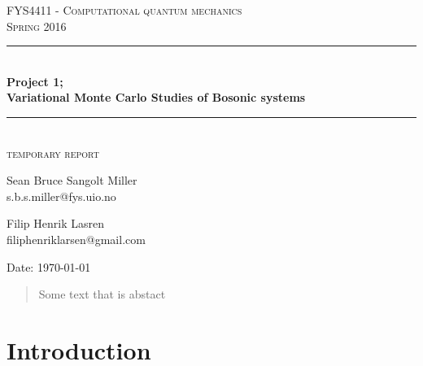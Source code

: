\documentclass[english, a4paper]{article}
\begin{document}
\renewcommand{\figurename}{Figure}
\begin{titlepage}
\begin{center}

\textsc{\Large FYS4411 - Computational quantum mechanics }\\[0.5cm]
\textsc{\Large Spring 2016}\\[1.5cm]
\rule{\linewidth}{0.5mm} \\[0.4cm]
{ \huge \bfseries  Project 1;\\ Variational Monte Carlo Studies of Bosonic systems}\\[0.10cm]
\rule{\linewidth}{0.5mm} \\[1.5cm]
\textsc{\Large temporary report}\\[1.5cm]


\begin{minipage}{\textwidth}
\begin{minipage}{0.49\textwidth}
    \begin{center} \large
        Sean Bruce Sangolt Miller\\
        {\footnotesize s.b.s.miller@fys.uio.no}
    \end{center}
\end{minipage}
\quad
\begin{minipage}{0.49\textwidth}
    \begin{center} \large
        Filip Henrik Lasren\\
        {\footnotesize filiphenriklarsen@gmail.com}
    \end{center}
\end{minipage}
\end{minipage}
\vfill

\large{Date: \today}

\end{center}
\end{titlepage}

\begin{abstract}
 Some text that is abstact
\end{abstract}


\tableofcontents
\newpage
{}%


\section{Introduction}
\end{document}
